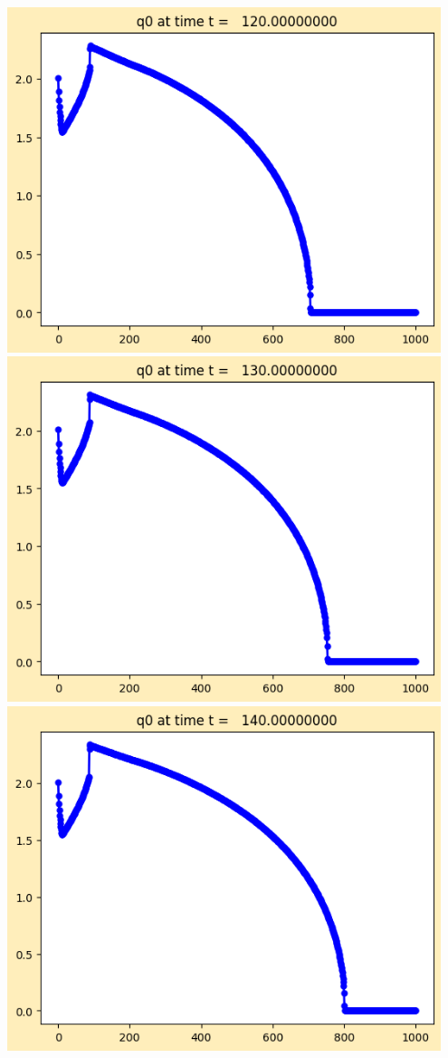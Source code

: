 \documentclass[11pt]{article}
\begin{document}
\vskip 10pt 
\includegraphics[width=0.95\textwidth]{frame0012fig1.png}
\vskip 10pt 
\includegraphics[width=0.95\textwidth]{frame0013fig1.png}
\vskip 10pt 
\includegraphics[width=0.95\textwidth]{frame0014fig1.png}
\end{document}
